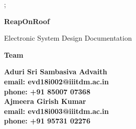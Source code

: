 \documentclass[a4paper,10pt]{book}
\begin{document}
\begin{titlepage}
    ;
    \vspace{7cm}
    \begin{center}
        {
        \fontsize{50}{60}\selectfont \textbf{ReapOnRoof}
        }
    \end{center}
    \begin{center}
        {
        \centering
        \fontsize{30}{50}\selectfont Electronic System Design Documentation
        }
    \end{center}
    
    \vspace{50px}
    
    \begin{center}
        \fontsize{30}{40} \textbf{Team}
    \end{center}
    
    \begin{center}
        \begin{multicols}{2}
            {
                \textbf{
                \fontsize{11}{13}\selectfont
                Aduri Sri Sambasiva Advaith\\
                email: evd18i002@iiitdm.ac.in\\
                phone: +91 85007 07368 \\
                \columnbreak
                Ajmeera Girish Kumar\\
                email: evd18i003@iiitdm.ac.in\\
                phone: +91 95731 02276
                }
            }
        \end{multicols}

    \end{center}


    
    \vspace{25px}
\end{titlepage}
\end{document}
